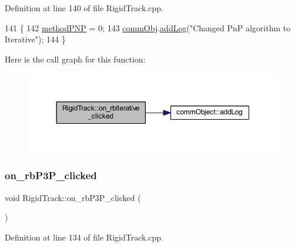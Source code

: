 Definition at line 140 of file Rigid\+Track.\+cpp.


\begin{DoxyCode}
141 \{
142     \hyperlink{main_8cpp_ab5e634b66221f494504aea1557af5df9}{methodPNP} = 0;
143     \hyperlink{main_8cpp_af29e7fc07ae0979d5fb61b473241d33d}{commObj}.\hyperlink{classcomm_object_aec354c7099b3039083cc4224e071e022}{addLog}(\textcolor{stringliteral}{"Changed PnP algorithm to Iterative"});
144 \}
\end{DoxyCode}
Here is the call graph for this function\+:\nopagebreak
\begin{figure}[H]
\begin{center}
\leavevmode
\includegraphics[width=350pt]{class_rigid_track_ae5bcdd3fb7203b4a7d1fa97c1460af31_cgraph}
\end{center}
\end{figure}
\mbox{\label{class_rigid_track_ac1f10ea5ec3f718c152e245a04776454}} 
\subsubsection{\texorpdfstring{on\+\_\+rb\+P3\+P\+\_\+clicked}{on\_rbP3P\_clicked}}
{\footnotesize\ttfamily void Rigid\+Track\+::on\+\_\+rb\+P3\+P\+\_\+clicked (\begin{DoxyParamCaption}{ }\end{DoxyParamCaption})\hspace{0.3cm}{\ttfamily [slot]}}



Definition at line 134 of file Rigid\+Track.\+cpp.


